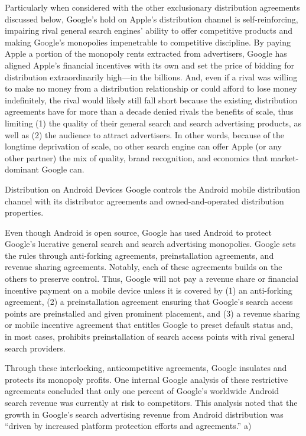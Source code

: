 \documentclass[11pt,b5paper]{scrartcl}
\begin{document}

Particularly when considered with the other exclusionary distribution agreements
discussed below, Google’s hold on Apple’s distribution channel is self-reinforcing, impairing
rival general search engines’ ability to offer competitive products and making Google’s
monopolies impenetrable to competitive discipline. By paying Apple a portion of the monopoly
rents extracted from advertisers, Google has aligned Apple’s financial incentives with its own
and set the price of bidding for distribution extraordinarily high—in the billions. And, even if a
rival was willing to make no money from a distribution relationship or could afford to lose
money indefinitely, the rival would likely still fall short because the existing distribution
agreements have for more than a decade denied rivals the benefits of scale, thus limiting (1) the
quality of their general search and search advertising products, as well as (2) the audience to
attract advertisers. In other words, because of the longtime deprivation of scale, no other search
engine can offer Apple (or any other partner) the mix of quality, brand recognition, and
economics that market-dominant Google can.




Distribution on Android Devices
Google controls the Android mobile distribution channel with its distributor
agreements and owned-and-operated distribution properties.


Even though Android is open source, Google has used Android to protect
Google’s lucrative general search and search advertising monopolies. Google sets the rules
through anti-forking agreements, preinstallation agreements, and revenue sharing agreements.
Notably, each of these agreements builds on the others to preserve control. Thus, Google will not
pay a revenue share or financial incentive payment on a mobile device unless it is covered by
(1) an anti-forking agreement, (2) a preinstallation agreement ensuring that Google’s search
access points are preinstalled and given prominent placement, and (3) a revenue sharing or
mobile incentive agreement that entitles Google to preset default status and, in most cases,
prohibits preinstallation of search access points with rival general search providers.


Through these interlocking, anticompetitive agreements, Google insulates and
protects its monopoly profits. One internal Google analysis of these restrictive agreements
concluded that only one percent of Google’s worldwide Android search revenue was currently at
risk to competitors. This analysis noted that the growth in Google’s search advertising revenue
from Android distribution was “driven by increased platform protection efforts and agreements.”
a)
\end{document}
